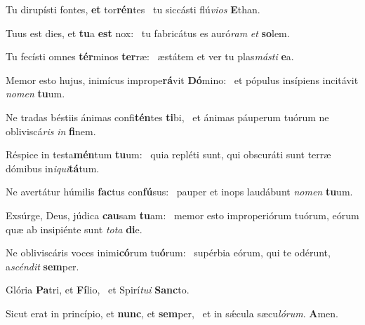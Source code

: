 \item Tu dirupísti fontes, \textbf{et} tor\textbf{rén}tes~\psstar{} tu siccásti flú\textit{vi}\textit{os} \textbf{E}than.
\item Tuus est dies, et \textbf{tu}a \textbf{est} nox:~\psstar{} tu fabricátus es auró\textit{ram} \textit{et} \textbf{so}lem.
\item Tu fecísti omnes \textbf{tér}minos \textbf{ter}ræ:~\psstar{} æstátem et ver tu plas\textit{más}\textit{ti} \textbf{e}a.
\item Memor esto hujus, inimícus imprope\textbf{rá}vit \textbf{Dó}mino:~\psstar{} et pópulus insípiens incitávit \textit{no}\textit{men} \textbf{tu}um.
\item Ne tradas béstiis ánimas confi\textbf{tén}tes \textbf{ti}bi,~\psstar{} et ánimas páuperum tuórum ne obliviscá\textit{ris} \textit{in} \textbf{fi}nem.
\item Réspice in testa\textbf{mén}tum \textbf{tu}um:~\psstar{} quia repléti sunt, qui obscuráti sunt terræ dómibus in\textit{i}\textit{qui}\textbf{tá}tum.
\item Ne avertátur húmilis \textbf{fac}tus con\textbf{fú}sus:~\psstar{} pauper et inops laudábunt \textit{no}\textit{men} \textbf{tu}um.
\item Exsúrge, Deus, júdica \textbf{cau}sam \textbf{tu}am:~\psstar{} memor esto improperiórum tuórum, eórum quæ ab insipiénte sunt \textit{to}\textit{ta} \textbf{di}e.
\item Ne obliviscáris voces inimi\textbf{có}rum tu\textbf{ó}rum:~\psstar{} supérbia eórum, qui te odérunt, a\textit{scén}\textit{dit} \textbf{sem}per.
\item Glória \textbf{Pa}tri, et \textbf{Fí}lio,~\psstar{} et Spirí\textit{tu}\textit{i} \textbf{Sanc}to.
\item Sicut erat in princípio, et \textbf{nunc}, et \textbf{sem}per,~\psstar{} et in sǽcula sæcu\textit{ló}\textit{rum}. \textbf{A}men.
